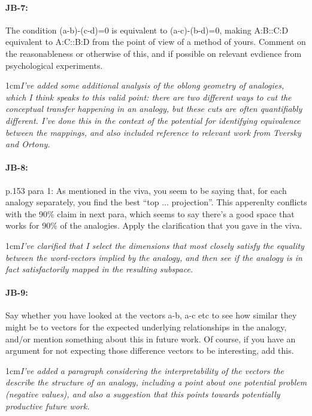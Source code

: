 \documentclass[11pt,a4paper]{article}
\newcommand{\res}[1]{\vspace{0.25cm} \begin{adjustwidth}{1cm}{}\emph{#1}\end{adjustwidth}}
\begin{document}
\paragraph{JB-7:} The condition (a-b)-(c-d)=0 is equivalent to (a-c)-(b-d)=0, making A:B::C:D equivalent to A:C::B:D from the point of view of a method of yours. Comment on the reasonableness or otherwise of this, and if possible on relevant evdience from psychological experiments.

\res{I've added some additional analysis of the oblong geometry of analogies, which I think speaks to this valid point: there are two different ways to cut the conceptual transfer happening in an analogy, but these cuts are often quantifiably different.  I've done this in the context of the potential for identifying equivalence between the mappings, and also included reference to relevant work from Tversky and Ortony.}

\paragraph{JB-8:} p.153 para 1: As mentioned in the viva, you seem to be saying that, for each analogy separately, you find the best ``top ... projection''. This apperenlty conflicts with the 90\% claim in next para, which seems to say there's a good space that works for 90\% of the analogies. Apply the clarification that you gave in the viva.

\res{I've clarified that I select the dimensions that most closely satisfy the equality between the word-vectors implied by the analogy, and then see if the analogy is in fact satisfactorily mapped in the resulting subspace.}

\paragraph{JB-9:} Say whether you have looked at the vectors a-b, a-c etc to see how similar they might be to vectors for the expected underlying relationships in the analogy, and/or mention something about this in future work. Of course, if you have an argument for not expecting those difference vectors to be interesting, add this.

\res{I've added a paragraph considering the interpretability of the vectors the describe the structure of an analogy, including a point about one potential problem (negative values), and also a suggestion that this points towards potentially productive future work.}
\end{document}
